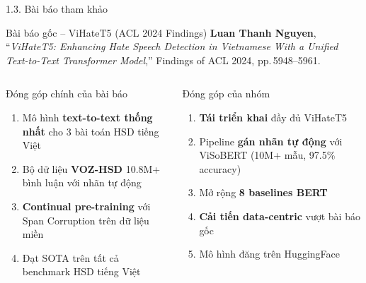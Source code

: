 \documentclass[11pt, aspectratio=169]{beamer}
\begin{document}
\begin{frame}[shrink=5]{1.3. Bài báo tham khảo}

\begin{block}{Bài báo gốc -- ViHateT5 (ACL 2024 Findings)}
  \textbf{Luan Thanh Nguyen}, ``\textit{ViHateT5: Enhancing Hate Speech Detection in Vietnamese With a Unified Text-to-Text Transformer Model},'' Findings of ACL 2024, pp.\,5948--5961.
\end{block}
\vspace{0.2cm}

\begin{columns}[T]
  \begin{block}{Đóng góp chính của bài báo}
    \begin{enumerate}
      \item Mô hình \textbf{text-to-text thống nhất} cho 3 bài toán HSD tiếng Việt
      \item Bộ dữ liệu \textbf{VOZ-HSD} 10.8M+ bình luận với nhãn tự động
      \item \textbf{Continual pre-training} với Span Corruption trên dữ liệu miền
      \item Đạt SOTA trên tất cả benchmark HSD tiếng Việt
    \end{enumerate}
  \end{block}

  \begin{block}{Đóng góp của nhóm}
    \begin{enumerate}
      \item \textbf{Tái triển khai} đầy đủ ViHateT5
      \item Pipeline \textbf{gán nhãn tự động} với ViSoBERT (10M+ mẫu, 97.5\% accuracy)
      \item Mở rộng \textbf{8 baselines BERT}
      \item \textbf{Cải tiến data-centric} vượt bài báo gốc
      \item Mô hình đăng trên HuggingFace
    \end{enumerate}
  \end{block}
\end{columns}
\end{frame}
\end{document}
